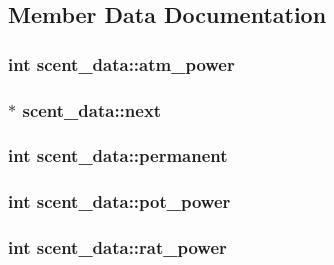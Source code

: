 \subsection{Member Data Documentation}
\hypertarget{structscent__data_a7395d0b6e08aae9ab46a58e0d1f4dba9}{
\subsubsection[{atm\-\_\-power}]{\setlength{\rightskip}{0pt plus 5cm}int scent\-\_\-data\-::atm\-\_\-power}}\label{structscent__data_a7395d0b6e08aae9ab46a58e0d1f4dba9}
\hypertarget{structscent__data_ac5e045f46ad3bb7e8d4554fde2d6d82e}{
\subsubsection[{next}]{$\ast$ scent\-\_\-data\-::next}}\label{structscent__data_ac5e045f46ad3bb7e8d4554fde2d6d82e}
\hypertarget{structscent__data_a1897cb251381c41c2f46e28a2dbf3f01}{
\subsubsection[{permanent}]{\setlength{\rightskip}{0pt plus 5cm}int scent\-\_\-data\-::permanent}}\label{structscent__data_a1897cb251381c41c2f46e28a2dbf3f01}
\hypertarget{structscent__data_afed2a2167fee608add589f51afef8652}{
\subsubsection[{pot\-\_\-power}]{\setlength{\rightskip}{0pt plus 5cm}int scent\-\_\-data\-::pot\-\_\-power}}\label{structscent__data_afed2a2167fee608add589f51afef8652}
\hypertarget{structscent__data_a6b5bfde0ebc03f7abf2e26a6ffd90ee6}{
\subsubsection[{rat\-\_\-power}]{\setlength{\rightskip}{0pt plus 5cm}int scent\-\_\-data\-::rat\-\_\-power}}\label{structscent__data_a6b5bfde0ebc03f7abf2e26a6ffd90ee6}
